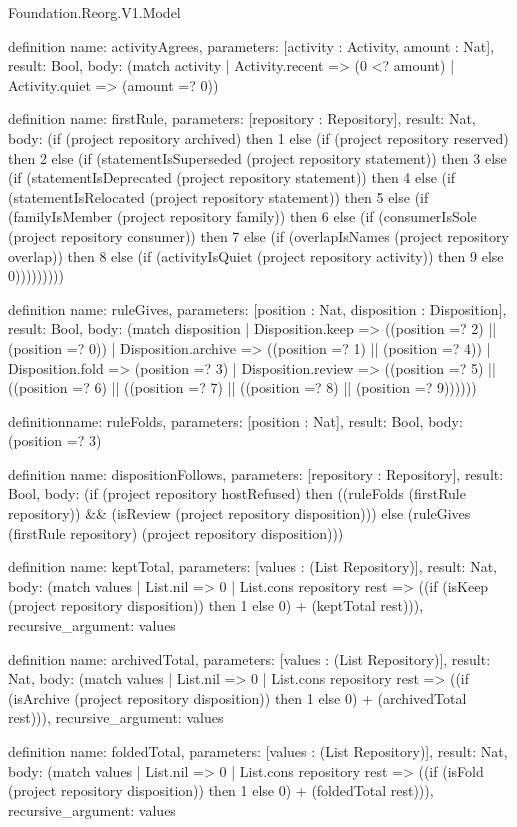 \begin{lexlean}{Foundation.Reorg.V1.Model}
\begin{semanticmodule}
definition{
  name: activityAgrees,
  parameters: [activity : Activity, amount : Nat],
  result: Bool,
  body: (match activity | Activity.recent => (0 <? amount) | Activity.quiet => (amount =? 0))
}

definition{
  name: firstRule,
  parameters: [repository : Repository],
  result: Nat,
  body: (if (project repository archived) then 1 else (if (project repository reserved) then 2 else (if (statementIsSuperseded (project repository statement)) then 3 else (if (statementIsDeprecated (project repository statement)) then 4 else (if (statementIsRelocated (project repository statement)) then 5 else (if (familyIsMember (project repository family)) then 6 else (if (consumerIsSole (project repository consumer)) then 7 else (if (overlapIsNames (project repository overlap)) then 8 else (if (activityIsQuiet (project repository activity)) then 9 else 0)))))))))
}

definition{
  name: ruleGives,
  parameters: [position : Nat, disposition : Disposition],
  result: Bool,
  body: (match disposition
    | Disposition.keep => ((position =? 2) || (position =? 0))
    | Disposition.archive => ((position =? 1) || (position =? 4))
    | Disposition.fold => (position =? 3)
    | Disposition.review => ((position =? 5) || ((position =? 6) || ((position =? 7) || ((position =? 8) || (position =? 9))))))
}

definition{name: ruleFolds, parameters: [position : Nat], result: Bool, body: (position =? 3)}

definition{
  name: dispositionFollows,
  parameters: [repository : Repository],
  result: Bool,
  body: (if (project repository hostRefused) then ((ruleFolds (firstRule repository)) && (isReview (project repository disposition))) else (ruleGives (firstRule repository) (project repository disposition)))
}

definition{
  name: keptTotal,
  parameters: [values : (List Repository)],
  result: Nat,
  body: (match values
    | List.nil => 0
    | List.cons repository rest => ((if (isKeep (project repository disposition)) then 1 else 0) + (keptTotal rest))),
  recursive_argument: values
}

definition{
  name: archivedTotal,
  parameters: [values : (List Repository)],
  result: Nat,
  body: (match values
    | List.nil => 0
    | List.cons repository rest => ((if (isArchive (project repository disposition)) then 1 else 0) + (archivedTotal rest))),
  recursive_argument: values
}

definition{
  name: foldedTotal,
  parameters: [values : (List Repository)],
  result: Nat,
  body: (match values
    | List.nil => 0
    | List.cons repository rest => ((if (isFold (project repository disposition)) then 1 else 0) + (foldedTotal rest))),
  recursive_argument: values
}


\end{semanticmodule}
\end{lexlean}
